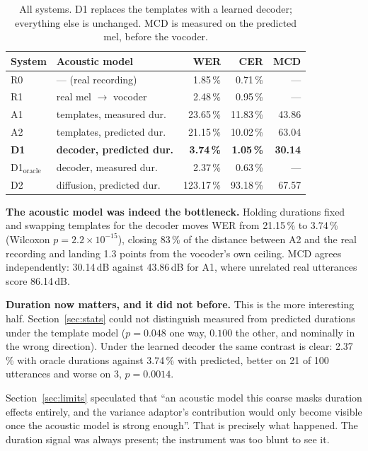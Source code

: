 \documentclass[conference]{IEEEtran}
\begin{document}
\begin{table}[t]
\caption{All systems. D1 replaces the templates with a learned decoder; everything else is
unchanged. MCD is measured on the predicted mel, before the vocoder.}
\label{tab:phase2}
\centering
\begin{tabular}{llrrr}
\toprule
\textbf{System} & \textbf{Acoustic model} & \textbf{WER} & \textbf{CER} & \textbf{MCD} \\
\midrule
R0 & --- (real recording)   & 1.85\,\%  & 0.71\,\%  & --- \\
R1 & real mel $\rightarrow$ vocoder & 2.48\,\%  & 0.95\,\%  & --- \\
A1 & templates, measured dur. & 23.65\,\% & 11.83\,\% & 43.86 \\
A2 & templates, predicted dur. & 21.15\,\% & 10.02\,\% & 63.04 \\
\textbf{D1} & \textbf{decoder, predicted dur.} & \textbf{3.74\,\%} & \textbf{1.05\,\%} & \textbf{30.14} \\
D1$_\textrm{oracle}$ & decoder, measured dur. & 2.37\,\% & 0.63\,\% & --- \\
D2 & diffusion, predicted dur. & 123.17\,\% & 93.18\,\% & 67.57 \\
\bottomrule
\end{tabular}
\end{table}

\textbf{The acoustic model was indeed the bottleneck.} Holding durations fixed and swapping
templates for the decoder moves WER from 21.15\,\% to 3.74\,\% (Wilcoxon $p = 2.2\times10^{-15}$),
closing 83\,\% of the distance between A2 and the real recording and landing 1.3 points from the
vocoder's own ceiling. MCD agrees independently: 30.14\,dB against 43.86\,dB for A1, where
unrelated real utterances score 86.14\,dB.

\textbf{Duration now matters, and it did not before.} This is the more interesting half.
Section~\ref{sec:stats} could not distinguish measured from predicted durations under the
template model ($p = 0.048$ one way, $0.100$ the other, and nominally in the wrong direction).
Under the learned decoder the same contrast is clear: 2.37\,\% with oracle durations against
3.74\,\% with predicted, better on 21 of 100 utterances and worse on 3, $p = 0.0014$.

Section~\ref{sec:limits} speculated that ``an acoustic model this coarse masks duration effects
entirely, and the variance adaptor's contribution would only become visible once the acoustic
model is strong enough''. That is precisely what happened. The duration signal was always present;
the instrument was too blunt to see it.
\end{document}

